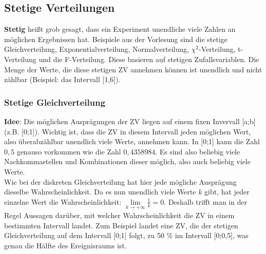 \documentclass[a4paper]{article}
\begin{document}
\subsection{Stetige Verteilungen} \label{sec:contdistr}
\textbf{Stetig} heißt grob gesagt, dass ein Experiment unendliche viele Zahlen an möglichen Ergebnissen hat. Beispiele aus der Vorlesung sind die stetige Gleichverteilung, Exponentialverteilung, Normalverteilung, $\chi^2$-Verteilung, t-Verteilung und die F-Verteilung. Diese basieren auf stetigen Zufallsvariablen. Die Menge der Werte, die diese stetigen ZV annehmen können ist unendlich und nicht zählbar (Beispiel: das Intervall [1,6]). 

\subsubsection{Stetige Gleichverteilung}\label{sec:Uni}

\textbf{Idee}: Die möglichen Ausprägungen der ZV liegen auf einem fixen Invervall [a;b] (z.B. [0;1]). Wichtig ist, dass die ZV in diesem Intervall jeden möglichen Wert, also überabzählbar unendlich viele Werte, annehmen kann. In [0;1] kann die Zahl $0,5$ genauso vorkommen wie die Zahl $0,4358984$. Es sind also beliebig viele Nachkommastellen und Kombinationen dieser möglich, also auch beliebig viele Werte. \\

\noindent Wie bei der diskreten Gleichverteilung hat hier jede mögliche Ausprägung dieselbe Wahrscheinlichkeit. Da es nun unendlich viele Werte $k$ gibt, hat jeder einzelne Wert die Wahrscheinlichkeit: $\lim\limits_{k \rightarrow +\infty}{\frac{1}{k}}=0$. Deshalb trifft man in der Regel Aussagen darüber, mit welcher Wahrscheinlichkeit die ZV in einem bestimmten Intervall landet. Zum Beispiel landet eine ZV, die der stetigen Gleichverteilung auf dem Intervall [0;1] folgt, zu 50 \% im Intervall [0;0,5], was genau die Hälfte des Ereignisraums ist.
\end{document}

